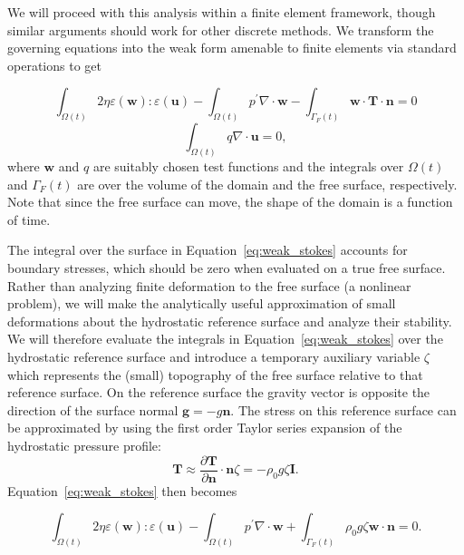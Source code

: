\documentclass[preprint,12pt,authoryear]{elsarticle}
\begin{document}
We will proceed with this analysis within a finite element framework, though similar arguments should 
work for other discrete methods.
We transform the governing equations into the weak form amenable to finite elements via standard operations \citep[e.g.][]{zienkiewicz1977finite} to get

\begin{equation}
\int_{\Omega(t)} 2 \eta \varepsilon( \mathbf{w} ) \colon \varepsilon( \mathbf{u} ) - \int_{\Omega(t)} p^\prime \nabla \cdot \mathbf{w} 
- \int_{\Gamma_F(t)} \mathbf{w} \cdot \mathbf{T} \cdot \mathbf{n} = 0 
\label{eq:weak_stokes}
\end{equation}
\begin{equation}
\int_{\Omega(t)} q \nabla \cdot \mathbf{u} = 0,
\label{eq:weak_incompressible}
\end{equation}
where $\mathbf{w}$ and $q$ are suitably chosen test functions and the integrals over 
$\Omega(t)$ and $\Gamma_F(t)$ are over the volume of the domain and the free surface, respectively.
Note that since the free surface can move, the shape of the domain is a function of time.

The integral over the surface in Equation~\eqref{eq:weak_stokes} accounts for boundary stresses, 
which should be zero when evaluated on a true free surface.
Rather than analyzing finite deformation to the free surface (a nonlinear problem),
we will make the analytically useful approximation of small deformations about the hydrostatic 
reference surface and analyze their stability.
We will therefore  evaluate the integrals in Equation~\eqref{eq:weak_stokes} 
over the hydrostatic reference surface and introduce a temporary auxiliary variable $\zeta$ which 
represents the (small) topography of the free surface relative to that reference surface.
On the reference surface the gravity vector is opposite the direction of the surface normal $\mathbf{g} = -g \mathbf{n}$.
The stress on this reference surface can be approximated by using the first order Taylor series
expansion of the hydrostatic pressure profile:
\begin{equation}
\mathbf{T} \approx \frac{\partial \mathbf{T}}{\partial \mathbf{n} } \cdot \mathbf{n} \zeta = -\rho_0 g \zeta \mathbf{I}.
\label{eq:hydrostatic}
\end{equation}
Equation~\eqref{eq:weak_stokes} then becomes

\begin{equation}
\int_{\Omega(t)} 2 \eta \varepsilon( \mathbf{w} ) \colon \varepsilon( \mathbf{u} ) - \int_{\Omega(t)} p^\prime \nabla \cdot \mathbf{w} 
+ \int_{\Gamma_F(t)} \rho_0 g \zeta  \mathbf{w} \cdot \mathbf{n} = 0.
\end{equation}
\end{document}
